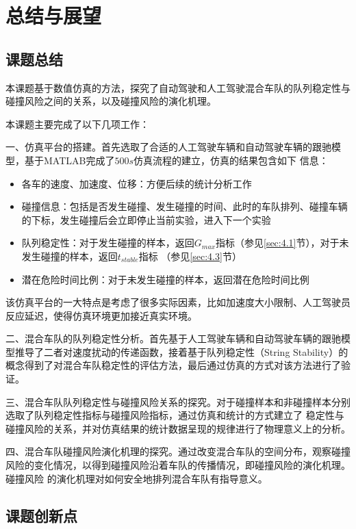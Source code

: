 
\chapter{总结与展望}

\section{课题总结}

本课题基于数值仿真的方法，探究了自动驾驶和人工驾驶混合车队的队列稳定性与碰撞风险之间的关系，以及碰撞风险的演化机理。

本课题主要完成了以下几项工作：

一、仿真平台的搭建。首先选取了合适的人工驾驶车辆和自动驾驶车辆的跟驰模型，基于MATLAB完成了$500s$仿真流程的建立，仿真的结果包含如下
信息：
\begin{itemize}
    \item 各车的速度、加速度、位移：方便后续的统计分析工作
    \item 碰撞信息：包括是否发生碰撞、发生碰撞的时间、此时的车队排列、碰撞车辆的下标，发生碰撞后会立即停止当前实验，进入下一个实验
    \item 队列稳定性：对于发生碰撞的样本，返回$G_{max}$指标（参见\ref{sec:4.1}节），对于未发生碰撞的样本，返回$t_{stable}$指标
    （参见\ref{sec:4.3}节）
    \item 潜在危险时间比例：对于未发生碰撞的样本，返回潜在危险时间比例
\end{itemize}

该仿真平台的一大特点是考虑了很多实际因素，比如加速度大小限制、人工驾驶员反应延迟，使得仿真环境更加接近真实环境。

二、混合车队的队列稳定性分析。首先基于人工驾驶车辆和自动驾驶车辆的跟驰模型推导了二者对速度扰动的传递函数，接着基于队列稳定性（String Stability）的
概念得到了对混合车队稳定性的评估方法，最后通过仿真的方式对该方法进行了验证。

三、混合车队队列稳定性与碰撞风险关系的探究。对于碰撞样本和非碰撞样本分别选取了队列稳定性指标与碰撞风险指标，通过仿真和统计的方式建立了
稳定性与碰撞风险的关系，并对仿真结果的统计数据呈现的规律进行了物理意义上的分析。

四、混合车队碰撞风险演化机理的探究。通过改变混合车队的空间分布，观察碰撞风险的变化情况，以得到碰撞风险沿着车队的传播情况，即碰撞风险的演化机理。碰撞风险
的演化机理对如何安全地排列混合车队有指导意义。

\section{课题创新点}


